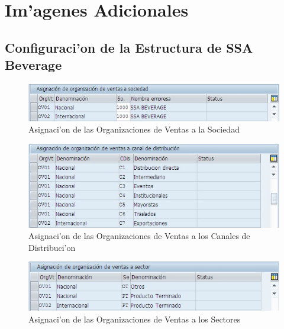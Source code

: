 \chapter{Im'agenes Adicionales}

\section{Configuraci'on de la Estructura de SSA Beverage}
\begin{figure}[htb]
\centering
\includegraphics[scale=0.65,type=jpg,ext=.jpg,read=.jpg]{figures/OrgVentasSociedad}
\caption{Asignaci'on de las Organizaciones de Ventas a la Sociedad}
\label{fig:asigna1}
\end{figure}
\begin{figure}[htb]
\centering
\includegraphics[scale=0.65,type=jpg,ext=.jpg,read=.jpg]{figures/OrgVentasCanales}
\caption{Asignaci'on de las Organizaciones de Ventas a los Canales de Distribuci'on}
\label{fig:asigna2}
\end{figure}
\begin{figure}[htb]
\centering
\includegraphics[scale=0.65,type=jpg,ext=.jpg,read=.jpg]{figures/OrgVentasSector}
\caption{Asignaci'on de las Organizaciones de Ventas a los Sectores}
\label{fig:asigna3}
\end{figure}
